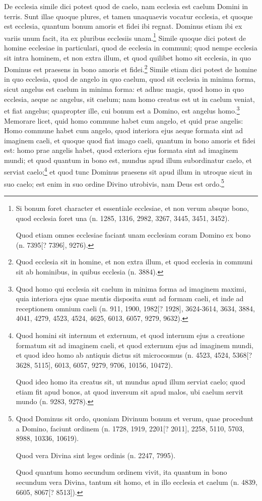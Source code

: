 \begin{topic}{57}
    De ecclesia simile dici potest quod de caelo, nam ecclesia est caelum Domini in terris.
    Sunt illae quoque plures, et tamen unaquaevis vocatur ecclesia, et quoque est ecclesia, quantum bonum amoris et
    fidei ibi regnat.
    Dominus etiam ibi ex variis unum facit, ita ex pluribus ecclesiis unam.\footnote{Si bonum foret character et
    essentiale ecclesiae, et non verum absque bono, quod ecclesia foret una (n. 1285, 1316, 2982, 3267, 3445, 3451,
    3452).

    Quod etiam omnes ecclesiae faciant unam ecclesiam coram Domino ex bono (n. 7395[? 7396], 9276).}
    Simile quoque dici potest de homine ecclesiae in particulari, quod de ecclesia in communi; quod nempe ecclesia sit
    intra hominem, et non extra illum, et quod quilibet homo sit ecclesia, in quo Dominus est praesens in bono amoris et
    fidei.\footnote{Quod ecclesia sit in homine, et non extra illum, et quod ecclesia in communi sit ab hominibus, in
    quibus ecclesia (n. 3884).}
    Simile etiam dici potest de homine in quo ecclesia, quod de angelo in quo caelum, quod sit ecclesia in minima forma,
    sicut angelus est caelum in minima forma: et adhuc magis, quod homo in quo ecclesia, aeque ac angelus, sit caelum;
    nam homo creatus est ut in caelum veniat, et fiat angelus; quapropter ille, cui bonum est a Domino, est angelus
    homo.\footnote{Quod homo qui ecclesia sit caelum in minima forma ad imaginem maximi, quia interiora ejus quae mentis
    disposita sunt ad formam caeli, et inde ad receptionem omnium caeli (n. 911, 1900, 1982[? 1928], 3624-3614, 3634,
    3884, 4041, 4279, 4523, 4524, 4625, 6013, 6057, 9279, 9632).}
    Memorare licet, quid homo commune habet cum angelo, et quid prae angelis: Homo commune habet cum angelo, quod
    interiora ejus aeque formata sint ad imaginem caeli, et quoque quod fiat imago caeli, quantum in bono amoris et
    fidei est: homo prae angelis habet, quod exteriora ejus formata sint ad imaginem mundi; et quod quantum in bono est,
    mundus apud illum subordinatur caelo, et serviat caelo;\footnote{Quod homini sit internum et externum, et quod
    internum ejus a creatione formatum sit ad imaginem caeli, et quod externum ejus ad imaginem mundi, et quod ideo homo
    ab antiquis dictus sit microcosmus (n. 4523, 4524, 5368[? 3628, 5115], 6013, 6057, 9279, 9706, 10156, 10472).

    Quod ideo homo ita creatus sit, ut mundus apud illum serviat caelo; quod etiam fit apud bonos, at quod inversum sit
    apud malos, ubi caelum servit mundo (n. 9283, 9278).} et quod tunc Dominus praesens sit apud illum in utroque sicut
    in suo caelo; est enim in suo ordine Divino utrobivis, nam Deus est ordo.\footnote{Quod Dominus sit ordo, quoniam
    Divinum bonum et verum, quae procedunt a Domino, faciunt ordinem (n. 1728, 1919, 2201[? 2011], 2258, 5110, 5703,
    8988, 10336, 10619).

    Quod vera Divina sint leges ordinis (n. 2247, 7995).

    Quod quantum homo secundum ordinem vivit, ita quantum in bono secundum vera Divina, tantum sit homo, et in illo
    ecclesia et caelum (n. 4839, 6605, 8067[? 8513]).}
\end{topic}

